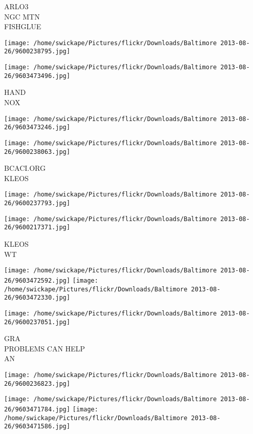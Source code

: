 \documentclass[10pt,letterpaper]{article}
\begin{document}
ARLO3\\
NGC MTN\\
FISHGLUE
\pagebreak

\texttt{[image: /home/swickape/Pictures/flickr/Downloads/Baltimore 2013-08-26/9600238795.jpg]}

\vspace{0.25in}
\texttt{[image: /home/swickape/Pictures/flickr/Downloads/Baltimore 2013-08-26/9603473496.jpg]}

HAND\\
NOX
\pagebreak

\texttt{[image: /home/swickape/Pictures/flickr/Downloads/Baltimore 2013-08-26/9603473246.jpg]}

\vspace{0.25in}
\texttt{[image: /home/swickape/Pictures/flickr/Downloads/Baltimore 2013-08-26/9600238063.jpg]}

BCACI.ORG\\
KLEOS
\pagebreak

\texttt{[image: /home/swickape/Pictures/flickr/Downloads/Baltimore 2013-08-26/9600237793.jpg]}

\vspace{0.25in}
\texttt{[image: /home/swickape/Pictures/flickr/Downloads/Baltimore 2013-08-26/9600217371.jpg]}

KLEOS\\
WT
\pagebreak

\texttt{[image: /home/swickape/Pictures/flickr/Downloads/Baltimore 2013-08-26/9603472592.jpg]}
\texttt{[image: /home/swickape/Pictures/flickr/Downloads/Baltimore 2013-08-26/9603472330.jpg]}

\texttt{[image: /home/swickape/Pictures/flickr/Downloads/Baltimore 2013-08-26/9600237051.jpg]}

GRA\\
PROBLEMS CAN HELP\\
AN
\pagebreak

\texttt{[image: /home/swickape/Pictures/flickr/Downloads/Baltimore 2013-08-26/9600236823.jpg]}

\vspace{0.25in}
\texttt{[image: /home/swickape/Pictures/flickr/Downloads/Baltimore 2013-08-26/9603471784.jpg]}
\texttt{[image: /home/swickape/Pictures/flickr/Downloads/Baltimore 2013-08-26/9603471586.jpg]}
\end{document}
